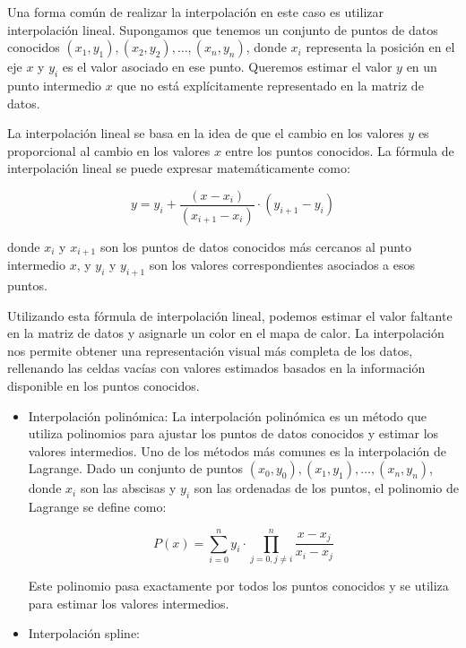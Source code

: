 \documentclass{article}
\begin{document}
\begin{itemize}
Una forma común de realizar la interpolación en este caso es utilizar interpolación lineal. Supongamos que tenemos un conjunto de puntos de datos conocidos $(x_1, y_1), (x_2, y_2), \ldots, (x_n, y_n)$, donde $x_i$ representa la posición en el eje $x$ y $y_i$ es el valor asociado en ese punto. Queremos estimar el valor $y$ en un punto intermedio $x$ que no está explícitamente representado en la matriz de datos.

La interpolación lineal se basa en la idea de que el cambio en los valores $y$ es proporcional al cambio en los valores $x$ entre los puntos conocidos. La fórmula de interpolación lineal se puede expresar matemáticamente como:

\begin{equation}
y = y_i + \frac{{(x - x_i)}}{{(x_{i+1} - x_i)}} \cdot (y_{i+1} - y_i)
\end{equation}

donde $x_i$ y $x_{i+1}$ son los puntos de datos conocidos más cercanos al punto intermedio $x$, y $y_i$ y $y_{i+1}$ son los valores correspondientes asociados a esos puntos.

Utilizando esta fórmula de interpolación lineal, podemos estimar el valor faltante en la matriz de datos y asignarle un color en el mapa de calor. La interpolación nos permite obtener una representación visual más completa de los datos, rellenando las celdas vacías con valores estimados basados en la información disponible en los puntos conocidos.

\begin{itemize}
\item Interpolación polinómica:
La interpolación polinómica es un método que utiliza polinomios para ajustar los puntos de datos conocidos y estimar los valores intermedios. Uno de los métodos más comunes es la interpolación de Lagrange. Dado un conjunto de puntos $(x_0, y_0), (x_1, y_1), \ldots, (x_n, y_n)$, donde $x_i$ son las abscisas y $y_i$ son las ordenadas de los puntos, el polinomio de Lagrange se define como:

\begin{equation}
    P(x) = \sum_{i=0}^{n} y_i \cdot \prod_{j=0, j \neq i}^{n} \frac{x - x_j}{x_i - x_j}
\end{equation}

Este polinomio pasa exactamente por todos los puntos conocidos y se utiliza para estimar los valores intermedios.

\item Interpolación spline:


\end{itemize}
\end{itemize}
\end{document}
